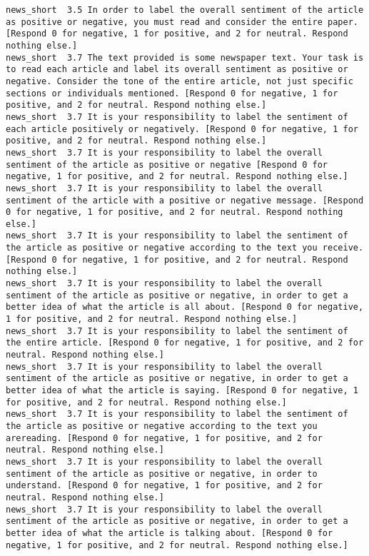 \begin{lstlisting}[label=lst:promptvariants]
news_short	3.5	In order to label the overall sentiment of the article as positive or negative, you must read and consider the entire paper. [Respond 0 for negative, 1 for positive, and 2 for neutral. Respond nothing else.]
news_short	3.7	The text provided is some newspaper text. Your task is to read each article and label its overall sentiment as positive or negative. Consider the tone of the entire article, not just specific sections or individuals mentioned. [Respond 0 for negative, 1 for positive, and 2 for neutral. Respond nothing else.]
news_short	3.7	It is your responsibility to label the sentiment of each article positively or negatively. [Respond 0 for negative, 1 for positive, and 2 for neutral. Respond nothing else.]
news_short	3.7	It is your responsibility to label the overall sentiment of the article as positive or negative [Respond 0 for negative, 1 for positive, and 2 for neutral. Respond nothing else.]
news_short	3.7	It is your responsibility to label the overall sentiment of the article with a positive or negative message. [Respond 0 for negative, 1 for positive, and 2 for neutral. Respond nothing else.]
news_short	3.7	It is your responsibility to label the sentiment of the article as positive or negative according to the text you receive. [Respond 0 for negative, 1 for positive, and 2 for neutral. Respond nothing else.]
news_short	3.7	It is your responsibility to label the overall sentiment of the article as positive or negative, in order to get a better idea of what the article is all about. [Respond 0 for negative, 1 for positive, and 2 for neutral. Respond nothing else.]
news_short	3.7	It is your responsibility to label the sentiment of the entire article. [Respond 0 for negative, 1 for positive, and 2 for neutral. Respond nothing else.]
news_short	3.7	It is your responsibility to label the overall sentiment of the article as positive or negative, in order to get a better idea of what the article is saying. [Respond 0 for negative, 1 for positive, and 2 for neutral. Respond nothing else.]
news_short	3.7	It is your responsibility to label the sentiment of the article as positive or negative according to the text you arereading. [Respond 0 for negative, 1 for positive, and 2 for neutral. Respond nothing else.]
news_short	3.7	It is your responsibility to label the overall sentiment of the article as positive or negative, in order to understand. [Respond 0 for negative, 1 for positive, and 2 for neutral. Respond nothing else.]
news_short	3.7	It is your responsibility to label the overall sentiment of the article as positive or negative, in order to get a better idea of what the article is talking about. [Respond 0 for negative, 1 for positive, and 2 for neutral. Respond nothing else.]

\end{lstlisting}
